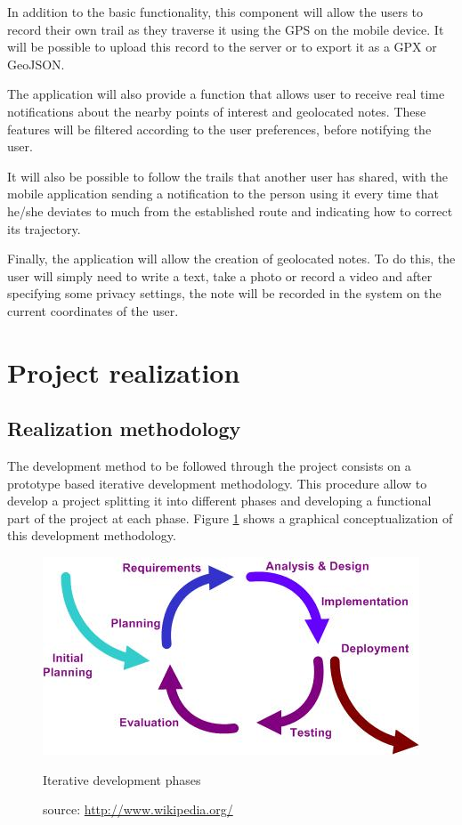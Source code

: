 In addition to the basic functionality, this component will allow the users to record their own trail as they traverse it using the GPS on the mobile device. It will be possible to upload this record to the server or to export it as a GPX or GeoJSON.

The application will also provide a function that allows user to receive real time notifications about the nearby points of interest and geolocated notes. These features will be filtered according to the user preferences, before notifying the user.

It will also be possible to follow the trails that another user has shared, with the mobile application sending a notification to the person using it every time that he/she deviates to much from the established route and indicating how to correct its trajectory.

Finally, the application will allow the creation of geolocated notes. To do this, the user will simply need to write a text, take a photo or record a video and after specifying some privacy settings, the note will be recorded in the system on the current coordinates of the user.

\section{Project realization}

\subsection{Realization methodology}

The development method to be followed through the project consists on a prototype based iterative development methodology. This procedure allow to develop a project splitting it into different phases and developing a functional part of the project at each phase. Figure \ref{fig:iterative} shows a graphical conceptualization of this development methodology.

\begin{figure}[ht]
  \centering
  \includegraphics[width=.8\textwidth]{fig/iterative}
  \caption{Iterative development phases}
  \caption*{source: \url{http://www.wikipedia.org/}}
  \label{fig:iterative}
\end{figure} 

